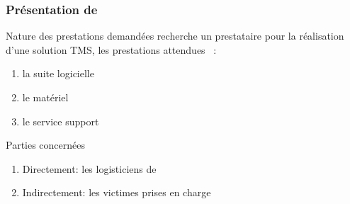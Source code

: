 \begin{frame}
	\frametitle {Présentation de \mo}
	\begin{block}{Nature des prestations demandées}
		\mo recherche  un prestataire pour la réalisation d'une solution TMS, les prestations attendues ~:
		\begin{enumerate}
			\item la suite logicielle \pause
			\item le matériel \pause
			\item le service support
		\end{enumerate}
	\end{block} \pause
	\begin{block}{Parties concernées}
		\begin{enumerate}
			\item Directement: les logisticiens de \mo
			\item Indirectement: les victimes prises en charge
		\end{enumerate}
	\end{block}
\end{frame}

\begin{frame}
	\frametitle {}
\end{frame}
